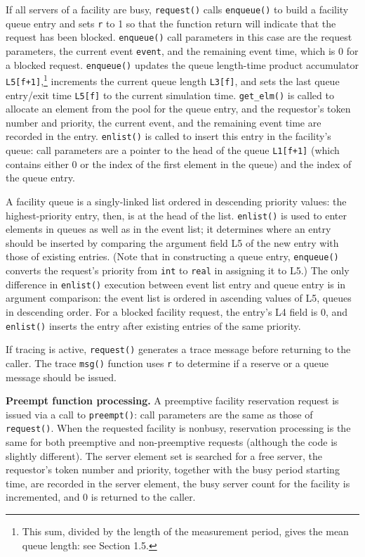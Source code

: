 If all servers of a facility are busy, \texttt{request()} calls \texttt{enqueue()} to build
a facility queue entry and sets \texttt{r} to 1 so that the function return will indicate
that the request has been blocked. \texttt{enqueue()} call parameters in this case
are the request parameters, the current event \texttt{event}, and the remaining
event time, which is 0 for a blocked request. \texttt{enqueue()} updates the queue
length-time product accumulator \texttt{L5[f+1]},\footnote{This sum, divided by the length of the measurement period, gives the mean queue length: see Section 1.5.}
increments the current queue
length \texttt{L3[f]}, and sets the last queue entry/exit time \texttt{L5[f]} to the current
simulation time. \texttt{get\_elm()} is called to allocate an element from the pool
for the queue entry, and the requestor's token number and priority, the current
event, and the remaining event time are recorded in the entry. \texttt{enlist()} is
called to insert this entry in the facility's queue: call parameters are a
pointer to the head of the queue \texttt{L1[f+1]} (which contains either 0 or the
index of the first element in the queue) and the index of the queue entry.

A facility queue is a singly-linked list ordered in descending priority
values: the highest-priority entry, then, is at the head of the list.
\texttt{enlist()} is used to enter elements in queues as well as in the event list; it
determines where an entry should be inserted by comparing the argument
field L5 of the new entry with those of existing entries. (Note that in
constructing a queue entry, \texttt{enqueue()} converts the request's priority from
\texttt{int} to \texttt{real} in assigning it to L5.) The only difference in \texttt{enlist()}
execution between event list entry and queue entry is in argument comparison:
the event list is ordered in ascending values of L5, queues in descending order.
For a blocked facility request, the entry's L4 field is 0, and \texttt{enlist()} inserts
the entry after existing entries of the same priority.

If tracing is active, \texttt{request()} generates a trace message before
returning to the caller. The trace \texttt{msg()} function uses \texttt{r} to determine if a
reserve or a queue message should be issued.

\textbf{Preempt function processing.} A preemptive facility reservation request is
issued via a call to \texttt{preempt()}: call parameters are the same as those of
\texttt{request()}. When the requested facility is nonbusy, reservation processing
is the same for both preemptive and non-preemptive requests (although the
code is slightly different). The server element set is searched for a free
server, the requestor's token number and priority, together with the busy
period starting time, are recorded in the server element, the busy server count
for the facility is incremented, and 0 is returned to the caller.

